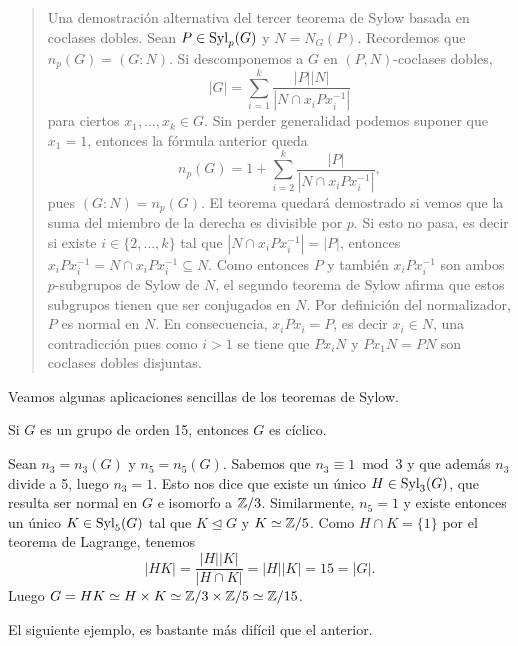 \begin{quote}
Una demostración alternativa del tercer teorema de Sylow basada en coclases dobles. 
Sean $P\in\mathrm{Syl}_p(G)$ y $N=N_G(P)$. Recordemos
que $n_p(G)=(G:N)$. Si descomponemos
a $G$ en $(P,N)$-coclases dobles, 
\[
|G|=\sum_{i=1}^k\frac{|P||N|}{|N\cap x_iPx_i^{-1}|}
\] 
para ciertos $x_1,\dots,x_k\in G$. Sin perder generalidad podemos suponer que $x_1=1$, entonces la fórmula anterior queda
\[
n_p(G)=1+\sum_{i=2}^k\frac{|P|}{|N\cap x_iPx_i^{-1}|},
\] 
pues $(G:N)=n_p(G)$. 
El teorema quedará demostrado si vemos que la suma del miembro de la derecha es divisible por $p$. Si esto no pasa, 
es decir si existe $i\in\{2,\dots,k\}$ tal que $|N\cap x_iPx_i^{-1}|=|P|$, entonces
$x_iPx_i^{-1}=N\cap x_iPx_i^{-1}\subseteq N$. Como entonces $P$ y también $x_iPx_i^{-1}$ son ambos $p$-subgrupos de Sylow de $N$,
el segundo teorema de Sylow afirma que estos subgrupos tienen que ser conjugados en $N$. Por definición del normalizador, $P$ es normal en $N$. 
En consecuencia, $x_iPx_i=P$, es decir $x_i\in N$, una contradicción pues como $i>1$ se tiene que 
$Px_iN$ y $Px_1N=PN$ son coclases dobles disjuntas.  
\end{quote}

Veamos algunas aplicaciones sencillas de los teoremas de Sylow. 

\begin{example}
Si $G$ es un grupo de orden 15, entonces $G$ es cíclico. 

Sean $n_3=n_3(G)$ y $n_5=n_5(G)$. Sabemos que $n_3\equiv1\bmod 3$ y que además $n_3$ divide a 5, luego $n_3=1$. Esto nos dice
que existe un único $H\in\mathrm{Syl}_3(G)$, que resulta ser normal en $G$ e isomorfo a $\mathbb{Z}/3$. Similarmente, $n_5=1$ y existe 
entonces un único $K\in\mathrm{Syl}_5(G)$ tal que $K\unlhd G$ y $K\simeq\mathbb{Z}/5$. Como $H\cap K=\{1\}$ por el teorema de Lagrange, tenemos
\[
|HK|=\frac{|H||K|}{|H\cap K|}=|H||K|=15=|G|.
\] 	
Luego $G=HK\simeq H\times K\simeq \mathbb{Z}/3\times\mathbb{Z}/5\simeq\mathbb{Z}/15$. 
\end{example}

El siguiente ejemplo, es bastante más difícil que el anterior.

